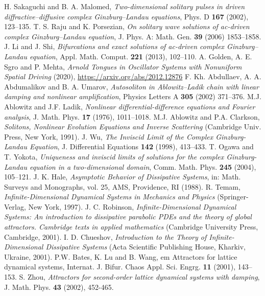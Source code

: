 \documentclass[preprintnumbers,amsmath,amssymb]{revtex4}
\begin{document}
\begin{thebibliography}{99}
 H. Sakaguchi and B. A. Malomed, {\em Two-dimensional solitary pulses in driven diffractive–diffusive complex Ginzburg–Landau equations}, Phys. D \textbf{167} (2002), 123--135.
%
  T. S. Raju and K. Porsezian, {\em On solitary wave solutions of ac-driven complex
	Ginzburg–Landau equation}, J. Phys. A: Math. Gen. \textbf{39} (2006) 1853–1858.
%
 J. Li and J. Shi, {\em Bifurcations and exact solutions of ac-driven complex
Ginzburg–Landau equation}, Appl. Math. Comput. \textbf{221} (2013), 102--110.
%
 A. Golden,  A. E. Sgro and P. Mehta, {\em Arnold Tongues in Oscillator Systems with Nonuniform Spatial Driving} (2020), \url{https://arxiv.org/abs/2012.12876}
%
 F. Kh. Abdullaev, A. A. Abdumalikov and  B. A. Umarov, {\em Autosoliton in Ablowitz–Ladik chain with linear damping and
nonlinear amplification}, Physics Letters A \textbf{305} (2002) 371--376.
%
 M.J. Ablowitz and J.F. Ladik, {\em Nonlinear differential-difference equations and Fourier analysis}, J. Math. Phys. {\bf 17} (1976), 1011--1018.
%
 M.J. Ablowitz and P.A. Clarkson, {\it Solitons, Nonlinear Evolution Equations and Inverse Scattering} (Cambridge Univ. Press, New York, 1991).
%
 J. Wu, {\em The Inviscid Limit of the Complex
	Ginzburg- Landau Equation}, J. Differential Equations \textbf{142} (1998), 413--433.
%
 T. Ogawa and T. Yokota, {\em Uniqueness and inviscid limits of solutions for the complex Ginzburg-Landau equation in a two-dimensional domain}, Comm. Math. Phys. \textbf{245} (2004), 105--121.
%
 J. K. Hale, {\it Asymptotic Behavior of Dissipative Systems}, in: Math. Surveys and Monographs, vol. 25, AMS, Providence, RI (1988). 
%
 R. Temam, {\it Infinite-Dimensional Dynamical Systems in Mechanics and Physics} (Springer-Verlag, New York, 1997).
%
 J. C. Robinson, {\it Infinite-Dimensional Dynamical Systems: An introduction to dissipative parabolic PDEs and the theory of global attractors. Cambridge texts in applied mathematics} (Cambridge University Press, Cambridge, 2001).
%
 I. D. Chueshov, {\it Introduction to the Theory of Infinite-Dimensional Dissipative Systems} (Acta Scientific Publishing House, Kharkiv, Ukraine, 2001).
%
 P.W. Bates, K. Lu and B. Wang, {em Attractors for lattice dynamical systems},  Internat. J. Bifur. Chaos Appl. Sci. Engrg. {\bf 11} (2001), 143--153.
% 
%
 S. Zhou, {\em Attractors for second-order lattice dynamical
	systems with damping}, J. Math. Phys. {\bf 43} (2002), 452-465.

\end{thebibliography}
\end{document}
